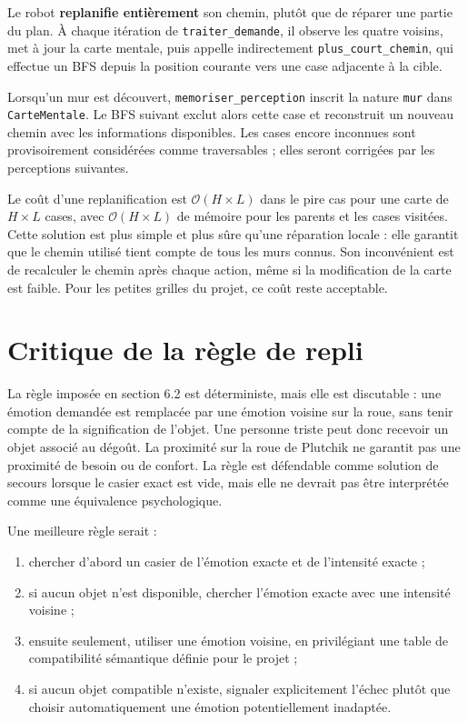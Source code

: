 \documentclass[11pt,a4paper]{article}
\begin{document}
Le robot \textbf{replanifie entièrement} son chemin, plutôt que de réparer une
partie du plan. À chaque itération de \texttt{traiter\_demande}, il observe les
quatre voisins, met à jour la carte mentale, puis appelle indirectement
\texttt{plus\_court\_chemin}, qui effectue un BFS depuis la position courante
vers une case adjacente à la cible.

Lorsqu'un mur est découvert, \texttt{memoriser\_perception} inscrit la nature
\texttt{mur} dans \texttt{CarteMentale}. Le BFS suivant exclut alors cette
case et reconstruit un nouveau chemin avec les informations disponibles. Les
cases encore inconnues sont provisoirement considérées comme traversables ;
elles seront corrigées par les perceptions suivantes.

Le coût d'une replanification est
\(\mathcal{O}(H\times L)\) dans le pire cas pour une carte de \(H\times L\)
cases, avec \(\mathcal{O}(H\times L)\) de mémoire pour les parents et les
cases visitées. Cette solution est plus simple et plus sûre qu'une réparation
locale : elle garantit que le chemin utilisé tient compte de tous les murs
connus. Son inconvénient est de recalculer le chemin après chaque action, même
si la modification de la carte est faible. Pour les petites grilles du
projet, ce coût reste acceptable.

\section{Critique de la règle de repli}

La règle imposée en section 6.2 est déterministe, mais elle est discutable :
une émotion demandée est remplacée par une émotion voisine sur la roue, sans
tenir compte de la signification de l'objet. Une personne triste peut donc
recevoir un objet associé au dégoût. La proximité sur la roue de Plutchik ne
garantit pas une proximité de besoin ou de confort. La règle est défendable
comme solution de secours lorsque le casier exact est vide, mais elle ne
devrait pas être interprétée comme une équivalence psychologique.

Une meilleure règle serait :

\begin{enumerate}
  \item chercher d'abord un casier de l'émotion exacte et de l'intensité
  exacte ;
  \item si aucun objet n'est disponible, chercher l'émotion exacte avec une
  intensité voisine ;
  \item ensuite seulement, utiliser une émotion voisine, en privilégiant une
  table de compatibilité sémantique définie pour le projet ;
  \item si aucun objet compatible n'existe, signaler explicitement l'échec
  plutôt que choisir automatiquement une émotion potentiellement inadaptée.
\end{enumerate}
\end{document}
